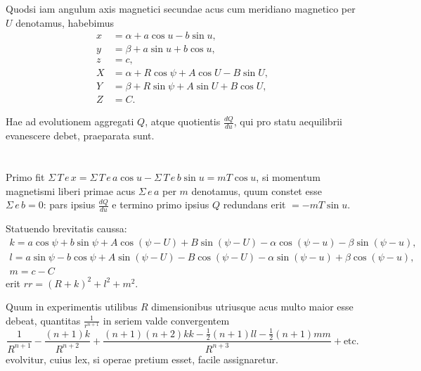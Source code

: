 \documentclass[fontsize=11pt,paper=a4,twoside,openany]{scrbook}
\begin{document}
Quodsi iam angulum axis magnetici secundae acus cum meridiano magnetico per $U$ denotamus, habebimus
\begin{align*}
x &= \alpha + a\cos u - b\sin u,\\
y &= \beta + a\sin u + b\cos u,\\
z &= c,\\
X &= \alpha + R\cos\psi + A\cos U - B\sin U,\\
Y &= \beta + R\sin\psi + A\sin U + B\cos U,\\
Z &= C.
\end{align*}

Hae ad evolutionem aggregati $Q$, atque quotientis $\frac{dQ}{du}$, qui pro statu aequilibrii evanescere debet, praeparata sunt.

\section{}

Primo fit $\Sigma\,T\,e\,x = \Sigma\,T\,e\,a\cos u - \Sigma\,T\,e\,b\sin u = mT\cos u$, si momentum magnetismi liberi primae acus $\Sigma\,e\,a$ per $m$ denotamus, quum constet esse $\Sigma\,e\,b=0$: pars ipsius $\frac{dQ}{du}$ e termino primo ipsius $Q$ redundans erit $= -mT\sin u$.

Statuendo brevitatis caussa:
\begin{multline*}
k = a\cos\psi + b\sin\psi + A\cos(\psi-U) + B\sin(\psi-U) - \alpha\cos(\psi-u) - \beta\sin(\psi-u),\\
l = a\sin\psi - b\cos\psi + A\sin(\psi-U) - B\cos(\psi-U) - \alpha\sin(\psi-u) + \beta\cos(\psi-u),\\
m = c-C
\end{multline*}
erit $rr = (R+k)^2+l^2+m^2$.

Quum in experimentis utilibus $R$ dimensionibus utriusque acus multo maior esse debeat, quantitas $\frac{1}{r^{n+1}}$ in seriem valde convergentem
\[
\frac{1}{R^{n+1}} - \frac{(n+1)k}{R^{n+2}} + \frac{(n+1)(n+2)kk - \frac{1}{2}(n+1)ll - \frac{1}{2}(n+1)mm}{R^{n+3}} + \text{etc.}
\]
evolvitur, cuius lex, si operae pretium esset, facile assignaretur.
\end{document}
